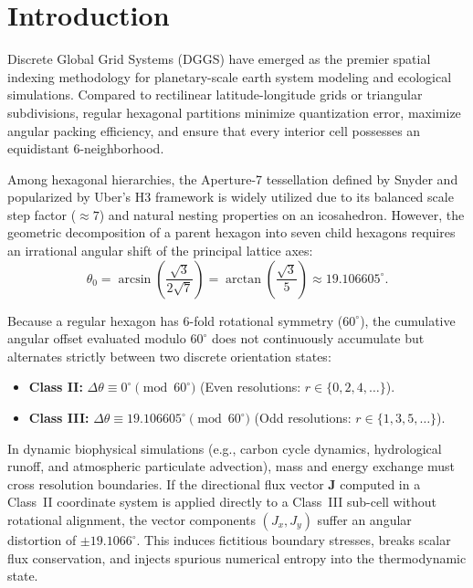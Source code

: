 \documentclass[10pt,journal,compsoc]{IEEEtran}
\begin{document}
\maketitle
\IEEEdisplaynontitleabstractindextext
\IEEEpeerreviewmaketitle

\section{Introduction}
 Discrete Global Grid Systems (DGGS) have emerged as the premier spatial indexing methodology for planetary-scale earth system modeling and ecological simulations. Compared to rectilinear latitude-longitude grids or triangular subdivisions, regular hexagonal partitions minimize quantization error, maximize angular packing efficiency, and ensure that every interior cell possesses an equidistant 6-neighborhood.

Among hexagonal hierarchies, the Aperture-7 tessellation defined by Snyder and popularized by Uber's H3 framework is widely utilized due to its balanced scale step factor ($\approx 7$) and natural nesting properties on an icosahedron. However, the geometric decomposition of a parent hexagon into seven child hexagons requires an irrational angular shift of the principal lattice axes:
\begin{equation}
\theta_0 = \arcsin\left(\frac{\sqrt{3}}{2\sqrt{7}}\right) = \arctan\left(\frac{\sqrt{3}}{5}\right) \approx 19.106605^\circ.
\label{eq:theta_def}
\end{equation}

Because a regular hexagon has 6-fold rotational symmetry ($60^\circ$), the cumulative angular offset evaluated modulo $60^\circ$ does not continuously accumulate but alternates strictly between two discrete orientation states:
\begin{itemize}
    \item \textbf{Class II:} $\Delta \theta \equiv 0^\circ \pmod{60^\circ}$ (Even resolutions: $r \in \{0, 2, 4, \dots\}$).
    \item \textbf{Class III:} $\Delta \theta \equiv 19.106605^\circ \pmod{60^\circ}$ (Odd resolutions: $r \in \{1, 3, 5, \dots\}$).
\end{itemize}

In dynamic biophysical simulations (e.g., carbon cycle dynamics, hydrological runoff, and atmospheric particulate advection), mass and energy exchange must cross resolution boundaries. If the directional flux vector $\mathbf{J}$ computed in a Class~II coordinate system is applied directly to a Class~III sub-cell without rotational alignment, the vector components $(J_x, J_y)$ suffer an angular distortion of $\pm 19.1066^\circ$. This induces fictitious boundary stresses, breaks scalar flux conservation, and injects spurious numerical entropy into the thermodynamic state.
\end{document}
